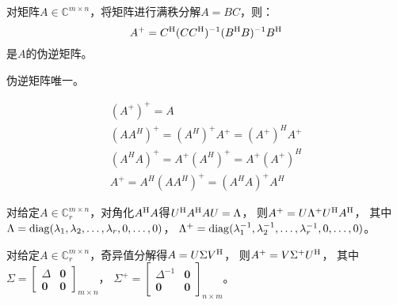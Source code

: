 \begin{theorem}[伪逆矩阵的求解]
    对矩阵$A\in \mathbb{C}^{m\times n}$，将矩阵进行满秩分解$A=BC$，则：
    \[
        A^+ = C^\mathrm{H} (CC^\mathrm{H})^{-1} (B^\mathrm{H} B)^{-1} B^\mathrm{H}
    \]
    是$A$的伪逆矩阵。
\end{theorem}

\begin{theorem}
    伪逆矩阵唯一。
\end{theorem}

\begin{property}
    \begin{gather*}
        \left(A^{+}\right)^{+}=A \\
        \left(A A^{H}\right)^{+}=\left(A^{H}\right)^{+} A^{+}=\left(A^{+}\right)^{H} A^{+} \\
        \left(A^{H} A\right)^{+}=A^{+}\left(A^{H}\right)^{+}=A^{+}\left(A^{+}\right)^{H} \\
        A^{+}=A^{H}\left(A A^{H}\right)^{+}=\left(A^{H} A\right)^{+} A^{H}
    \end{gather*}
\end{property}

\begin{theorem}[伪逆矩阵的求解2]
    对给定$A\in \mathbb{C}^{m\times n}_r$，对角化$A^\mathrm{H} A$得$U^\mathrm{H} A^\mathrm{H} A U=\Lambda$，
    则$A^{+}=U \Lambda^{+} U^\mathrm{H} A^\mathrm{H}$，
    其中$\Lambda=\DiagMatrix(\VectorComma{\lambda}{r},\linebreak[1]0,\linebreak[1]\dots,\linebreak[1]0)$，
    $\Lambda^{+}=\DiagMatrix(\lambda_1^{-1},\linebreak[1]\lambda_2^{-1},\linebreak[1]\dots,\linebreak[1]\lambda_r^{-1},\linebreak[1]0,\linebreak[1]\dots,\linebreak[1]0)$。
\end{theorem}

\begin{theorem}[伪逆矩阵的求解3]
    对给定$A\in \mathbb{C}^{m\times n}_r$，奇异值分解得$A=U\Sigma V^\mathrm{H}$，
    则$A^{+} = V \Sigma^{+} U^\mathrm{H}$，
    其中$\Sigma=\begin{bmatrix}\Delta&\bm{0}\\\bm{0}&\bm{0}\end{bmatrix}_{m\times n}$，
    $\Sigma^{+}=\begin{bmatrix}\Delta^{-1}&\bm{0}\\\bm{0}&\bm{0}\end{bmatrix}_{n\times m}$。
\end{theorem}

